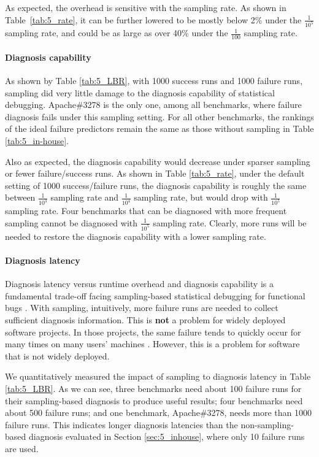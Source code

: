 As expected, the overhead is sensitive with the sampling rate. As shown in
Table~\ref{tab:5_rate}, it can be further lowered to be mostly below 2\% under
the $\frac{1}{10^{5}}$ sampling rate, and could be as large as over 40\% under
the $\frac{1}{100}$ sampling rate.


\paragraph{Diagnosis capability}
As shown by Table \ref{tab:5_LBR}, with 1000 success runs
and 1000 failure runs, sampling did very little damage to
the diagnosis capability of statistical debugging. 
Apache\#3278 is the only one, among all benchmarks, where 
failure diagnosis fails under this sampling setting.
For all other benchmarks, the
rankings of the ideal failure predictors remain the same as those 
without sampling in Table \ref{tab:5_in-house}.

Also as expected, the diagnosis capability would decrease under sparser
sampling or fewer failure/success runs. As shown in Table \ref{tab:5_rate},
under the default setting of 1000 success/failure runs, the diagnosis capability
is roughly the same between $\frac{1}{10^{3}}$ sampling rate and 
$\frac{1}{10^{4}}$ sampling
rate, but would drop with $\frac{1}{10^{5}}$ sampling rate. 
Four benchmarks that can be diagnosed 
with more frequent sampling cannot be diagnosed with
$\frac{1}{10^{5}}$ sampling rate.
Clearly, more
runs will be needed to restore the diagnosis capability with a lower
sampling rate.

\paragraph{Diagnosis latency}
Diagnosis latency versus runtime overhead and diagnosis capability 
is a fundamental trade-off facing
sampling-based statistical debugging for functional bugs \citep{liblit03,liblit05,CCI}.
With sampling, intuitively, more failure runs are needed
to collect sufficient diagnosis information. This is \textbf{not} a problem for widely
deployed software projects. In those projects, the same failure tends to quickly occur
for many times on many users' machines
\citep{hunt.sosp09}. However, this is a problem
for software that is not widely deployed.

We quantitatively measured the impact of sampling to diagnosis latency in 
Table \ref{tab:5_LBR}. As we can see, three benchmarks need about 100 failure
runs for their sampling-based diagnosis to produce useful results; 
four benchmarks need about 500 failure runs; and one benchmark, Apache\#3278, 
needs more than 1000 failure runs. This
indicates longer diagnosis latencies than the non-sampling-based diagnosis
evaluated in Section \ref{sec:5_inhouse}, where only 10 failure runs are used.

